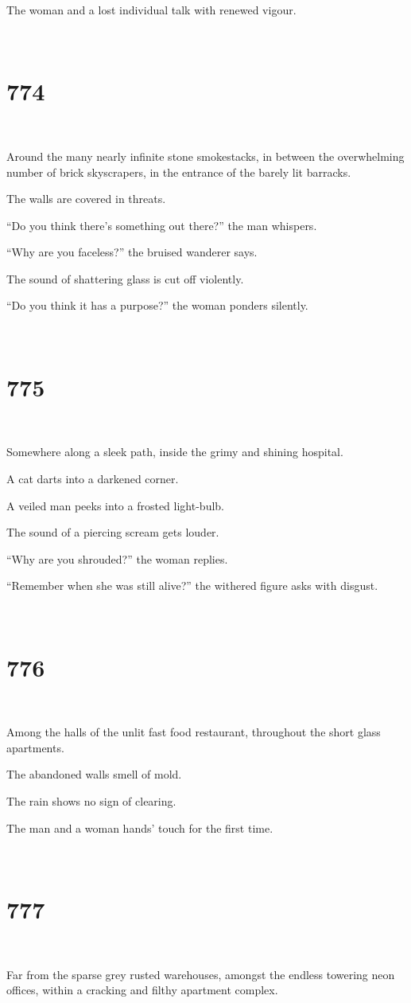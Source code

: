 \documentclass{report}
\begin{document}
The woman and a lost individual talk with renewed vigour.

~
\chapter*{774}
~

Around the many nearly infinite stone smokestacks, in between the overwhelming number of brick skyscrapers, in the entrance of the barely lit barracks.

The walls are covered in threats.

``Do you think there's something out there?'' the man whispers.

``Why are you faceless?'' the bruised wanderer says.

The sound of shattering glass is cut off violently.

``Do you think it has a purpose?'' the woman ponders silently.

~
\chapter*{775}
~

Somewhere along a sleek path, inside the grimy and shining hospital.

A cat darts into a darkened corner.

A veiled man peeks into a frosted light-bulb.

The sound of a piercing scream gets louder.

``Why are you shrouded?'' the woman replies.

``Remember when she was still alive?'' the withered figure asks with disgust.

~
\chapter*{776}
~

Among the halls of the unlit fast food restaurant, throughout the short glass apartments.

The abandoned walls smell of mold.

The rain shows no sign of clearing.

The man and a woman hands' touch for the first time.

~
\chapter*{777}
~

Far from the sparse grey rusted warehouses, amongst the endless towering neon offices, within a cracking and filthy apartment complex.
\end{document}
